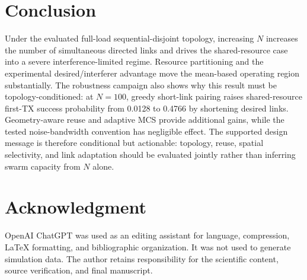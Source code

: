 \section{Conclusion}
Under the evaluated full-load sequential-disjoint topology, increasing $N$ increases the number of simultaneous directed links and drives the shared-resource case into a severe interference-limited regime. Resource partitioning and the experimental desired/interferer advantage move the mean-based operating region substantially. The robustness campaign also shows why this result must be topology-conditioned: at $N=100$, greedy short-link pairing raises shared-resource first-TX success probability from 0.0128 to 0.4766 by shortening desired links. Geometry-aware reuse and adaptive MCS provide additional gains, while the tested noise-bandwidth convention has negligible effect. The supported design message is therefore conditional but actionable: topology, reuse, spatial selectivity, and link adaptation should be evaluated jointly rather than inferring swarm capacity from $N$ alone.

\section*{Acknowledgment}
OpenAI ChatGPT was used as an editing assistant for language, compression, LaTeX formatting, and bibliographic organization. It was not used to generate simulation data. The author retains responsibility for the scientific content, source verification, and final manuscript.
